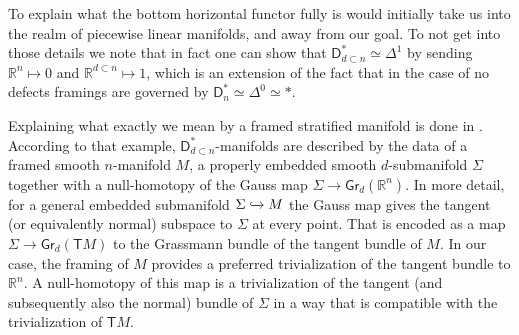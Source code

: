 \documentclass[../text]{subfiles}
\begin{document}
\begin{remark}
    To explain what the bottom horizontal functor fully is would initially take us into the realm of piecewise linear manifolds, and away from our goal. To not get into those details we note that in fact one can show that $\mathsf{D}_{d \subset n}^* \simeq \Delta^1$ by sending $\mathbb{R}^n \mapsto 0$ and $\mathbb{R}^{d \subset n} \mapsto 1$, which is an extension of the fact that in the case of no defects framings are governed by $ \mathsf{D}_n^* \simeq \Delta^0 \simeq *$.

    Explaining what exactly we mean by a framed stratified manifold is done in \cite[ex.5.2.12]{aft_localstrut}. According to that example, $\mathsf{D}_{d \subset n}^*$-manifolds are described by the data of a framed smooth $n$-manifold $M$, a properly embedded smooth $d$-submanifold $\Sigma$ together with a null-homotopy of the Gauss map $\Sigma \rightarrow \mathsf{Gr}_d(\mathbb{R}^n)$. In more detail, for a general embedded submanifold $\Sigma \xhookrightarrow{} M$ the Gauss map gives the tangent (or equivalently normal) subspace to $\Sigma$ at every point. That is encoded as a map $\Sigma \rightarrow \mathsf{Gr}_d(\mathsf{T}M)$ to the Grassmann bundle of the tangent bundle of $M$. In our case, the framing of $M$ provides a preferred trivialization of the tangent bundle to $\mathbb{R}^n$. A null-homotopy of this map is a trivialization of the tangent (and subsequently also the normal) bundle of $\Sigma$ in a way that is compatible with the trivialization of $\mathsf{T}M$.
\end{remark}
\end{document}

